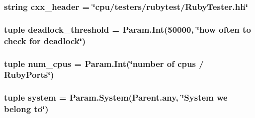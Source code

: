 \label{classRubyTester_1_1RubyTester_ab3e342922861f8da4d310967fdbfbd72}
\hypertarget{classRubyTester_1_1RubyTester_a17da7064bc5c518791f0c891eff05fda}{
\subsubsection[{cxx\_\-header}]{\setlength{\rightskip}{0pt plus 5cm}string {\bf cxx\_\-header} = \char`\"{}cpu/testers/rubytest/RubyTester.hh\char`\"{}}}
\label{classRubyTester_1_1RubyTester_a17da7064bc5c518791f0c891eff05fda}
\hypertarget{classRubyTester_1_1RubyTester_a642b24433a9b8d923a6fee4e6dce2bb0}{
\subsubsection[{deadlock\_\-threshold}]{\setlength{\rightskip}{0pt plus 5cm}tuple {\bf deadlock\_\-threshold} = Param.Int(50000, \char`\"{}how often to check for deadlock\char`\"{})}}
\label{classRubyTester_1_1RubyTester_a642b24433a9b8d923a6fee4e6dce2bb0}
\hypertarget{classRubyTester_1_1RubyTester_ab0bd6c2c9c8cc012f980111834ffc3a9}{
\subsubsection[{num\_\-cpus}]{\setlength{\rightskip}{0pt plus 5cm}tuple {\bf num\_\-cpus} = Param.Int(\char`\"{}number of cpus / RubyPorts\char`\"{})}}
\label{classRubyTester_1_1RubyTester_ab0bd6c2c9c8cc012f980111834ffc3a9}
\hypertarget{classRubyTester_1_1RubyTester_ab737471139f5a296e5b26e8a0e1b0744}{
\subsubsection[{system}]{\setlength{\rightskip}{0pt plus 5cm}tuple {\bf system} = Param.System(Parent.any, \char`\"{}System we belong to\char`\"{})}}
